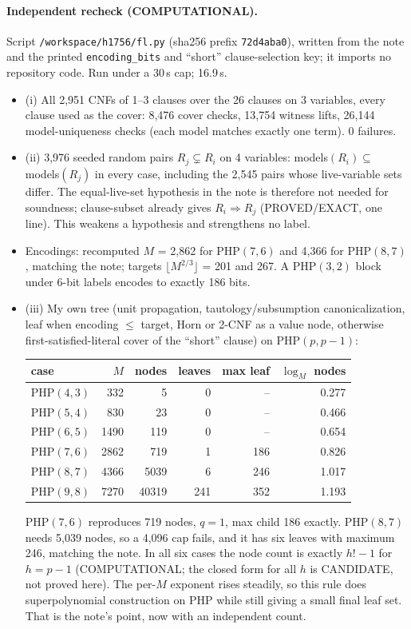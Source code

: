 \documentclass[11pt]{article}
\begin{document}
\paragraph{Independent recheck (COMPUTATIONAL).} Script \texttt{/workspace/h1756/fl.py} (sha256 prefix \texttt{72d4aba0}), written from the note and the printed \texttt{encoding\_bits} and ``short'' clause-selection key; it imports no repository code. Run under a 30\,s cap; 16.9\,s.
\begin{itemize}
\item (i) All 2{,}951 CNFs of 1--3 clauses over the 26 clauses on 3 variables, every clause used as the cover: 8{,}476 cover checks, 13{,}754 witness lifts, 26{,}144 model-uniqueness checks (each model matches exactly one term). 0 failures.
\item (ii) 3{,}976 seeded random pairs $R_j\subsetneq R_i$ on 4 variables: models$(R_i)\subseteq$ models$(R_j)$ in every case, including the 2{,}545 pairs whose live-variable sets differ. The equal-live-set hypothesis in the note is therefore not needed for soundness; clause-subset already gives $R_i\Rightarrow R_j$ (PROVED/EXACT, one line). This weakens a hypothesis and strengthens no label.
\item Encodings: recomputed $M$ = 2{,}862 for PHP$(7,6)$ and 4{,}366 for PHP$(8,7)$, matching the note; targets $\lfloor M^{2/3}\rfloor$ = 201 and 267. A PHP$(3,2)$ block under 6-bit labels encodes to exactly 186 bits.
\item (iii) My own tree (unit propagation, tautology/subsumption canonicalization, leaf when encoding $\le$ target, Horn or 2-CNF as a value node, otherwise first-satisfied-literal cover of the ``short'' clause) on PHP$(p,p-1)$:
\begin{center}
\begin{tabular}{lrrrrr}
case & $M$ & nodes & leaves & max leaf & $\log_M$ nodes\\\hline
PHP$(4,3)$ & 332 & 5 & 0 & -- & 0.277\\
PHP$(5,4)$ & 830 & 23 & 0 & -- & 0.466\\
PHP$(6,5)$ & 1490 & 119 & 0 & -- & 0.654\\
PHP$(7,6)$ & 2862 & 719 & 1 & 186 & 0.826\\
PHP$(8,7)$ & 4366 & 5039 & 6 & 246 & 1.017\\
PHP$(9,8)$ & 7270 & 40319 & 241 & 352 & 1.193\\
\end{tabular}
\end{center}
PHP$(7,6)$ reproduces 719 nodes, $q=1$, max child 186 exactly. PHP$(8,7)$ needs 5{,}039 nodes, so a 4{,}096 cap fails, and it has six leaves with maximum 246, matching the note. In all six cases the node count is exactly $h!-1$ for $h=p-1$ (COMPUTATIONAL; the closed form for all $h$ is CANDIDATE, not proved here). The per-$M$ exponent rises steadily, so this rule does superpolynomial construction on PHP while still giving a small final leaf set. That is the note's point, now with an independent count.

\end{itemize}
\end{document}
